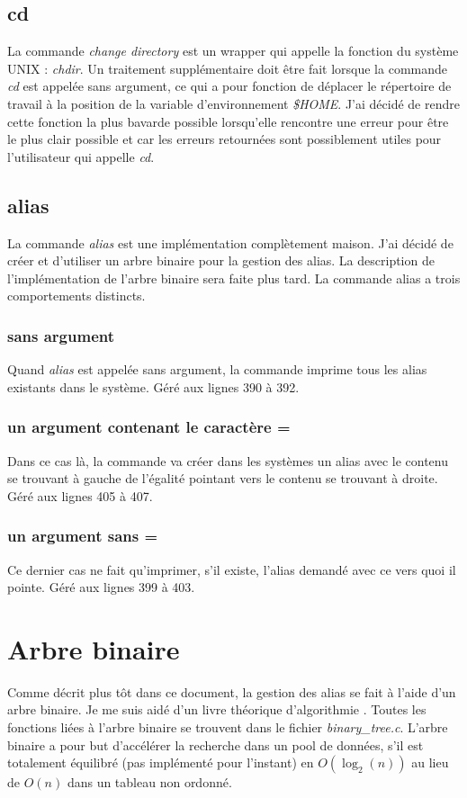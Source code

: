 \documentclass[a4paper,10pt]{article}
\begin{document}
\subsection{cd}
La commande \emph{change directory} est un wrapper qui appelle la fonction du système UNIX : \emph{chdir}.
Un traitement supplémentaire doit être fait lorsque la commande \emph{cd} est appelée sans argument, ce qui a pour fonction de déplacer le répertoire de travail à la position de la variable d'environnement \emph{\$HOME}.
J'ai décidé de rendre cette fonction la plus bavarde possible lorsqu'elle rencontre une erreur pour être le plus clair possible et car les erreurs retournées sont possiblement utiles pour l'utilisateur qui appelle \emph{cd}.
\subsection{alias}
La commande \emph{alias} est une implémentation complètement maison. J'ai décidé de créer et d'utiliser un arbre binaire pour la gestion des alias. La description de l'implémentation de l'arbre binaire sera faite plus tard.
La commande alias a trois comportements distincts.
\subsubsection{sans argument}
Quand \emph{alias} est appelée sans argument, la commande imprime tous les alias existants dans le système. Géré aux lignes 390 à 392.
\subsubsection{un argument contenant le caractère =}
Dans ce cas là, la commande va créer dans les systèmes un alias avec le contenu se trouvant à gauche de l'égalité pointant vers le contenu se trouvant à droite. Géré aux lignes 405 à 407.
\subsubsection{un argument sans =}
Ce dernier cas ne fait qu'imprimer, s'il existe, l'alias demandé avec ce vers quoi il pointe. Géré aux lignes 399 à 403.
\pagebreak
\section{Arbre binaire}
Comme décrit plus tôt dans ce document, la gestion des alias se fait à l'aide d'un arbre binaire.
Je me suis aidé d'un livre théorique d'algorithmie \cite{ref}. Toutes les fonctions liées à l'arbre binaire se trouvent dans le fichier \emph{binary\_tree.c}. L'arbre binaire a pour but d'accélérer la recherche dans un pool de données, s'il est totalement équilibré (pas implémenté pour l'instant) en $O(\log_2(n))$ au lieu de $O(n)$ dans un tableau non ordonné.
\end{document}
